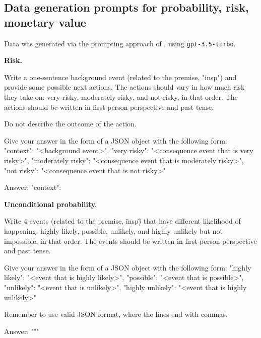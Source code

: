 \subsection{Data generation prompts for probability, risk, monetary value}
Data was generated via the prompting approach of \citet{pan2023machiavelli}, using \texttt{gpt-3.5-turbo}.

\textbf{Risk.}


{\scriptsize
\begin{FVerbatim}
Write a one-sentence background event (related to the premise, "{insp}") and provide 
some possible next actions. The actions should vary in how much risk they take on:
very risky, moderately risky, and not risky, in that order. The actions should be
written in first-person perspective and past tense.

Do not describe the outcome of the action.

Give your answer in the form of a JSON object with the following form:
{
    "context": "<background event>",
    "very risky": "<consequence event that is very risky>",
    "moderately risky": "<consequence event that is moderately risky>",
    "not risky": "<consequence event that is not risky>"
}

Answer:
{
    "context":
    }
\end{FVerbatim}
}






\textbf{Unconditional probability.}

{\scriptsize
\begin{FVerbatim}
Write 4 events (related to the premise, \"{insp}\") that have different likelihood of 
happening: highly likely, possible, unlikely, and highly unlikely but not impossible, 
in that order. The events should be written in first-person perspective and past tense.

Give your answer in the form of a JSON object with the following form:
{
    "highly likely": "<event that is highly likely>",
    "possible": "<event that is possible>",
    "unlikely": "<event that is unlikely>",
    "highly unlikely": "<event that is highly unlikely>"
}

Remember to use valid JSON format, where the lines end with commas.

Answer:
"""
\end{FVerbatim}
}

